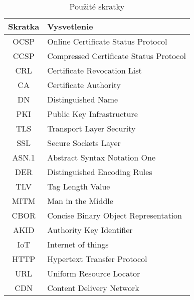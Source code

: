 \documentclass[12pt, twoside]{book}
\begin{document}
\newpage 
\pagestyle{plain}
\setcounter{page}{13}
\fancyfoot[C]{\thepage}
\setlength\cftaftertoctitleskip{20pt}
\tableofcontents

\newpage\null\thispagestyle{empty}\newpage



\newpage


\listoffigures

\newpage\null\thispagestyle{empty}\newpage

\newpage

\begin{table}[H]
\begin{center}
\renewcommand\thetable{1}
\caption{Použité skratky}
\begin{tabular}{ |c|C{10cm}| } 
 \hline
\textbf{Skratka} & \textbf{Vysvetlenie} 
 \\ \hline
OCSP  & Online Certificate Status Protocol
\\ \hline
CCSP  & Compressed Certificate Status Protocol
\\ \hline
CRL  & Certificate Revocation List
\\ \hline
CA  & Certificate Authority
\\ \hline
DN  & Distinguished Name
\\ \hline
PKI  & Public Key Infrastructure
\\ \hline
TLS  & Transport Layer Security
\\ \hline
SSL  & Secure Sockets Layer
\\ \hline
ASN.1 & Abstract Syntax Notation One
\\ \hline
DER & Distinguished Encoding Rules
\\ \hline
TLV & Tag Length Value
\\ \hline
MITM & Man in the Middle
\\ \hline
CBOR & Concise Binary Object Representation
\\ \hline
AKID & Authority Key Identifier
\\ \hline
IoT & Internet of things
\\ \hline
HTTP & Hypertext Transfer Protocol
\\ \hline
URL & Uniform Resource Locator
\\ \hline
CDN & Content Delivery Network
\\ \hline
\end{tabular}
\end{center}
\end{table}
\end{document}
